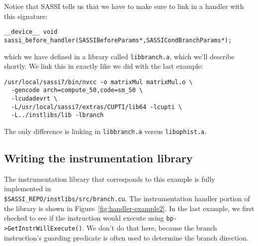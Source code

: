 Notice that SASSI tells us that we have to make sure to link in a
handler with this signature:
\begin{lstlisting}
__device__ void sassi_before_handler(SASSIBeforeParams*,SASSICondBranchParams*);
\end{lstlisting}
which we have defined in a library called \texttt{libbranch.a}, which
we'll describe shortly.  We link this in exactly like we did with the
last example:
\begin{lstlisting}[style=BashInputStyle]
/usr/local/sassi7/bin/nvcc -o matrixMul matrixMul.o \
  -gencode arch=compute_50,code=sm_50 \
  -lcudadevrt \
  -L/usr/local/sassi7/extras/CUPTI/lib64 -lcupti \
  -L../instlibs/lib -lbranch
\end{lstlisting}
The only difference is linking in \texttt{libbranch.a} versus
\texttt{libophist.a}.

\subsection{Writing the instrumentation library}

The instrumentation library that corresponds to this example is fully
implemented in \\ \texttt{\$SASSI\_REPO/instlibs/src/branch.cu}.  The
instrumentation handler portion of the library is shown in
Figure~\ref{fig:handler-example2}.  In the last example, we first
checked to see if the instruction would execute using
\texttt{bp->GetInstrWillExecute()}.  We don't do that here, because
the branch instruction's guarding predicate is often used to determine
the branch direction.

